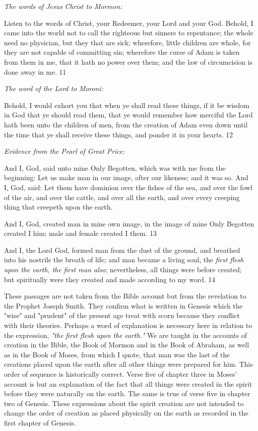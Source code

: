 \textit{The words of Jesus Christ to Mormon:}

Listen to the words of Christ, your Redeemer, your Lord and your God. Behold, I came into
the world not to call the righteous but sinners to repentance; the whole need no physician, but
they that are sick; wherefore, little children are whole, for they are not capable of committing
sin; wherefore the curse of Adam is taken from them in me, that it hath no power over them;
and the law of circumcision is done away in me. 11

\textit{The word of the Lord to Moroni:}

Behold, I would exhort you that when ye shall read these things, if it be wisdom in God that
ye should read them, that ye would remember how merciful the Lord hath been unto the
children of men, from the creation of Adam even down until the time that ye shall receive
these things, and ponder it in your hearts. 12

\textit{Evidence from the Pearl of Great Price:}

And I, God, said unto mine Only Begotten, which was with me from the beginning: Let us
make man in our image, after our likeness; and it was so. And I, God, said: Let them have
dominion over the fishes of the sea, and over the fowl of the air, and over the cattle, and over
all the earth, and over every creeping thing that creepeth upon the earth.

And I, God, created man in mine own image, in the image of mine Only Begotten created I
him; male and female created I them. 13

And I, the Lord God, formed man from the dust of the ground, and breathed into his nostrils
the breath of life; and man became a living soul, the \textit{first flesh upon the earth, the first man
also}; nevertheless, all things were before created; but spiritually were they created and made
according to my word. 14

These passages are not taken from the Bible account but from the revelation to the Prophet
Joseph Smith. They confirm what is written in Genesis which the "wise" and "prudent" of the
present age treat with scorn because they conflict with their theories. Perhaps a word of
explanation is necessary here in relation to the expression, \textit{"the first flesh upon the earth."}
We are taught in the accounts of creation in the Bible, the Book of Mormon and in the Book
of Abraham, as well as in the Book of Moses, from which I quote, that man was the last of
the creations placed upon the earth after all other things were prepared for him. This order of
sequence is historically correct. Verse five of chapter three in Moses' account is but an
explanation of the fact that all things were created in the spirit before they were naturally on
the earth. The same is true of verse five in chapter two of Genesis. These expressions about
the spirit creation are not intended to change the order of creation as placed physically on the
earth as recorded in the first chapter of Genesis.

